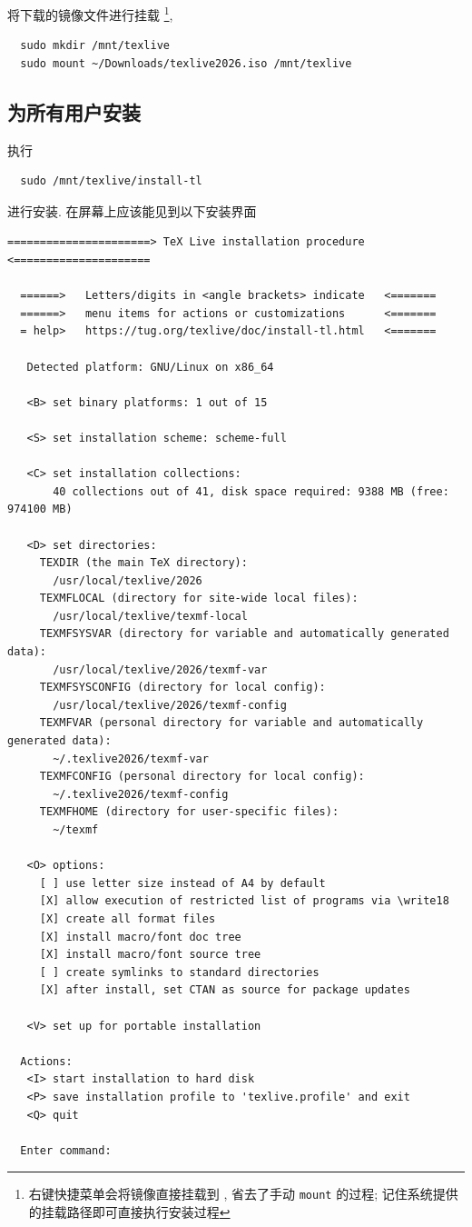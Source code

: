将下载的镜像文件进行挂载%
\footnote{右键快捷菜单会将镜像直接挂载到 ,
省去了手动 \texttt{mount} 的过程;
记住系统提供的挂载路径即可直接执行安装过程},
\begin{lstlisting}
  sudo mkdir /mnt/texlive
  sudo mount ~/Downloads/texlive2026.iso /mnt/texlive
\end{lstlisting}

\subsection{为所有用户安装}

执行
\begin{lstlisting}
  sudo /mnt/texlive/install-tl
\end{lstlisting}
进行安装.
在屏幕上应该能见到以下安装界面
\begin{lstlisting}[language = {}, deleteemph = set]
  ======================> TeX Live installation procedure <=====================

  ======>   Letters/digits in <angle brackets> indicate   <=======
  ======>   menu items for actions or customizations      <=======
  = help>   https://tug.org/texlive/doc/install-tl.html   <=======

   Detected platform: GNU/Linux on x86_64

   <B> set binary platforms: 1 out of 15

   <S> set installation scheme: scheme-full

   <C> set installation collections:
       40 collections out of 41, disk space required: 9388 MB (free: 974100 MB)

   <D> set directories:
     TEXDIR (the main TeX directory):
       /usr/local/texlive/2026
     TEXMFLOCAL (directory for site-wide local files):
       /usr/local/texlive/texmf-local
     TEXMFSYSVAR (directory for variable and automatically generated data):
       /usr/local/texlive/2026/texmf-var
     TEXMFSYSCONFIG (directory for local config):
       /usr/local/texlive/2026/texmf-config
     TEXMFVAR (personal directory for variable and automatically generated data):
       ~/.texlive2026/texmf-var
     TEXMFCONFIG (personal directory for local config):
       ~/.texlive2026/texmf-config
     TEXMFHOME (directory for user-specific files):
       ~/texmf

   <O> options:
     [ ] use letter size instead of A4 by default
     [X] allow execution of restricted list of programs via \write18
     [X] create all format files
     [X] install macro/font doc tree
     [X] install macro/font source tree
     [ ] create symlinks to standard directories
     [X] after install, set CTAN as source for package updates

   <V> set up for portable installation

  Actions:
   <I> start installation to hard disk
   <P> save installation profile to 'texlive.profile' and exit
   <Q> quit

  Enter command:
\end{lstlisting}
